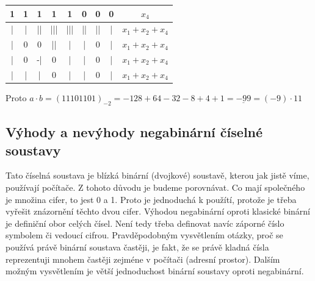 \documentclass[czech,bachelor,dept470,male]{diploma}
\begin{document}
\begin{itemize}
\begin{center}
\begin{tabular}{|c|c|c|c|c|c|c|c|c|}
			      1 & 1 & 1  & 1   & 1   & 0  & 0  & 0 & $x_4$             \\ \hline \hline
			      | & | & || & ||| & ||| & || & || & | & $x_1 + x_2 + x_4$ \\ \hline
			      | & 0 & 0  & ||  & |   & |  & 0  & | & $x_1 + x_2 + x_4$ \\ \hline
			      | & 0 & -| & 0   & |   & |  & 0  & | & $x_1 + x_2 + x_4$ \\ \hline
			      | & | & |  & 0   & |   & |  & 0  & | & $x_1 + x_2 + x_4$ \\ \hline
		      \end{tabular}
	      \end{center}
	      Proto $a\cdot b = (11101101)_{-2} = -128 + 64 - 32 -8 + 4 + 1 = \underline{- 99} = (-9)\cdot 11$
\end{itemize}
\subsection{Výhody a nevýhody negabinární číselné soustavy}
Tato číselná soustava je blízká binární (dvojkové) soustavě, kterou jak jistě víme, používají počítače. Z tohoto důvodu je budeme porovnávat. Co mají společného je množina cifer, to jest 0 a 1. Proto je jednoduchá k použítí, protože je třeba vyřešit znázornění těchto dvou cifer. Výhodou negabinární oproti klasické binární je definiční obor celých čísel. Není tedy třeba definovat navíc záporné číslo symbolem či vedoucí cifrou. Pravděpodobným vysvětlením otázky, proč se používá právě binární soustava častěji, je fakt, že se právě kladná čísla reprezentuji mnohem častěji zejméne v počítači (adresní prostor). Dalším možným vysvětlením je větší jednoduchost binární soustavy oproti negabinární.
\end{document}
